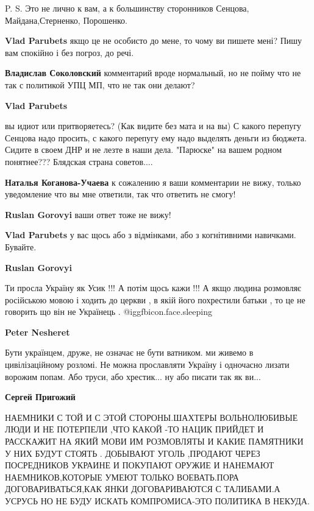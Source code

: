 \begin{itemize}
\begin{itemize}
P. S. Это не лично к вам, а к большинству сторонников Сенцова,
Майдана,Стерненко, Порошенко.


\textbf{Vlad Parubets} якщо це не особисто до мене, то чому ви пишете мені? Пишу вам спокійно і без погроз, до речі.

\textbf{Владислав Соколовский} комментарий вроде нормальный, но не пойму что не так с политикой УПЦ МП, что не так они делают?

\textbf{Vlad Parubets} 

вы идиот или притворяетесь? (Как видите без мата и на вы) С какого перепугу
Сенцова надо просить, с какого перепугу ему надо выделять деньги из бюджета.
Сидите в своем ДНР и не лезте в наши дела. "Парюске" на вашем родном
понятнее??? Блядская страна советов....


\textbf{Наталья Коганова-Учаева} к сожалению я ваши комментарии не вижу, только уведомление что вы мне ответили, так что ответить не смогу!

\textbf{Ruslan Gorovyi} ваши ответ тоже не вижу!


\textbf{Vlad Parubets} у вас щось або з відмінками, або з когнітивними навичками. Бувайте.

\textbf{Ruslan Gorovyi} 

Ти просла Україну як Усик !!! А потім щось кажи !!! А якщо людина розмовляє
російською мовою і ходить до церкви , в якій його похрестили батьки , то це не
говорить що він не Українець .  @igg{fbicon.face.sleeping} 


\textbf{Peter Nesheret} 

Бути українцем, друже, не означає не бути ватником. ми живемо в цивілізаційному
розломі. Не можна прославляти Україну і одночасно лизати ворожим попам. Або
труси, або хрестик... ну або писати так як ви...

\textbf{Сергей Пригожий} 

НАЕМНИКИ С ТОЙ И С ЭТОЙ СТОРОНЫ.ШАХТЕРЫ ВОЛЬНОЛЮБИВЫЕ ЛЮДИ И НЕ ПОТЕРПЕЛИ ,ЧТО
КАКОЙ -ТО НАЦИК ПРИЙДЕТ И РАССКАЖИТ НА ЯКИЙ МОВИ ИМ РОЗМОВЛЯТЫ И КАКИЕ
ПАМЯТНИКИ У НИХ БУДУТ СТОЯТЬ . ДОБЫВАЮТ УГОЛЬ ,ПРОДАЮТ ЧЕРЕЗ ПОСРЕДНИКОВ
УКРАИНЕ И ПОКУПАЮТ ОРУЖИЕ И НАНЕМАЮТ НАЕМНИКОВ,КОТОРЫЕ УМЕЮТ ТОЛЬКО
ВОЕВАТЬ.ПОРА ДОГОВАРИВАТЬСЯ,КАК ЯНКИ ДОГОВАРИВАЮТСЯ С ТАЛИБАМИ.А УСРУСЬ НО НЕ
БУДУ ИСКАТЬ КОМПРОМИСА-ЭТО ПОЛИТИКА В НЕКУДА.



\end{itemize}
\end{itemize}
